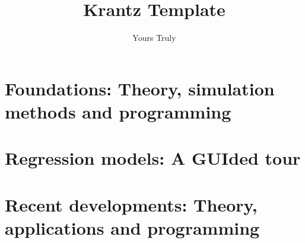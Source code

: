 \documentclass[krantz1]{krantz} %
\begin{document}
\frontmatter

\title{Krantz Template} %
\author{Yours Truly}


\halftitle

\booktitle

\locpage


\cleardoublepage
\setcounter{page}{7} %
\tableofcontents





\mainmatter

\part{Foundations: Theory, simulation methods and programming}





\part{Regression models: A GUIded tour}





\part{Recent developments: Theory, applications and programming}









\printindex
\end{document}
